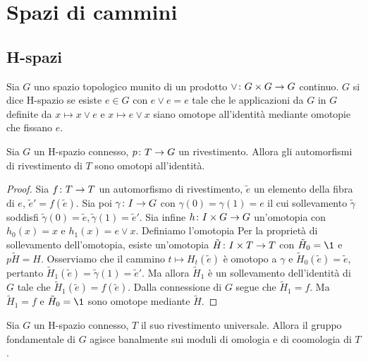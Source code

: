 \chapter{Spazi di cammini}
\section{H-spazi}
\begin{definition}
Sia $G$ uno spazio topologico munito di un prodotto $\vee\colon G\times G\to G$ continuo. $G$ si dice H-spazio se esiste $e\in G$ con $e\vee e=e$ tale che le applicazioni da $G$ in $G$ definite da $x\mapsto x\vee e$ e $x\mapsto e\vee x$ siano omotope all'identità mediante omotopie che fissano $e$.
\end{definition}
\begin{proposition}
Sia $G$ un H-spazio connesso, $p\colon T\to G$ un rivestimento. Allora gli automorfismi di rivestimento di $T$ sono omotopi all'identità.
\end{proposition}
\begin{proof}
Sia $f\colon T\to T$ un automorfismo di rivestimento, $\tilde{e}$ un elemento della fibra di $e$, $\tilde{e}'=f(\tilde{e})$. Sia poi $\gamma\colon I\to G$ con $\gamma(0)=\gamma(1)=e$ il cui sollevamento $\tilde\gamma$ soddisfi $\tilde\gamma(0)=\tilde{e},\tilde\gamma(1)=\tilde{e}'$. Sia infine $h\colon I\times G\to G$ un'omotopia con $h_0(x)=x$ e $h_1(x)=e\vee x$. Definiamo l'omotopia
Per la proprietà di sollevamento dell'omotopia, esiste un'omotopia $\tilde{H}\colon I\times T\to T$ con $\tilde{H}_0=\1$ e $p\tilde{H}=H$. Osserviamo che il cammino $t\mapsto H_t(\tilde{e})$ è omotopo a $\gamma$ e $\tilde{H}_0(\tilde{e})=\tilde{e}$, pertanto $\tilde{H}_1(\tilde{e})=\tilde{\gamma}(1)=\tilde{e}'$. Ma allora $\tilde{H}_1$ è un sollevamento dell'identità di $G$ tale che $\tilde{H}_1(\tilde{e})=f(\tilde{e})$. Dalla connessione di $G$ segue che $\tilde{H}_1=f$. Ma $\tilde{H}_1=f$ e $\tilde{H}_0=\1$ sono omotope mediante $\tilde H$.
\end{proof}
\begin{corollary}
Sia $G$ un H-spazio connesso, $T$ il suo rivestimento universale. Allora il gruppo fondamentale di $G$ agisce banalmente sui moduli di omologia e di coomologia di $T$.
\end{corollary}

